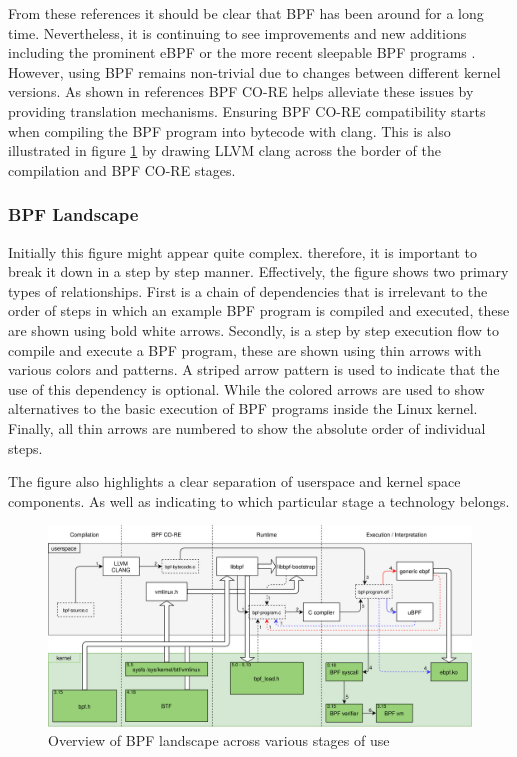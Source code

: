\documentclass[conference]{IEEEtran}
\begin{document}
From these references it should be clear that BPF has been around for a long
time. Nevertheless, it is continuing to see improvements and new additions
including the prominent eBPF or the more recent sleepable BPF
programs \cite{bpf-features}. However, using BPF remains non-trivial due to
changes between different kernel versions. As shown in references BPF CO-RE
helps alleviate these issues by providing translation mechanisms. Ensuring
BPF CO-RE compatibility starts when compiling the BPF program into bytecode with
clang. This is also illustrated in figure \ref{fig:bpf-landscape} by drawing
LLVM clang across the border of the compilation and BPF CO-RE stages.

\subsubsection{BPF Landscape}

Initially this figure might appear quite complex. therefore, it is important to
break it down in a step by step manner. Effectively, the figure shows two
primary types of relationships. First is a chain of dependencies that is
irrelevant to the order of steps in which an example BPF program is compiled and
executed, these are shown using bold white arrows. Secondly, is a step by step
execution flow to compile and execute a BPF program, these are shown using thin
arrows with various colors and patterns. A striped arrow pattern is used to
indicate that the use of this dependency is optional. While the colored arrows
are used to show alternatives to the basic execution of BPF programs
inside the Linux kernel. Finally, all thin arrows are numbered to show the
absolute order of individual steps.

The figure also highlights a clear separation of userspace and kernel space
components. As well as indicating to which particular stage a technology
belongs.

\onecolumn

\begin{center}
	\begin{figure}[H]
		\includegraphics[width=1\textwidth]{resources/images/bpf-landscape.png}
		\captionsetup{justification=centering}
		\caption{Overview of BPF landscape across various stages of use}
		\label{fig:bpf-landscape}
	\end{figure}
\end{center}
\end{document}
